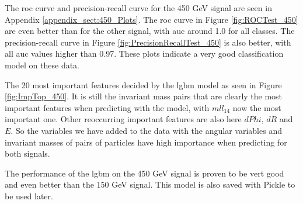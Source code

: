 \documentclass[a4paper, american, 12pt]{report}
\begin{document}
	The \acrshort{roc} curve and precision-recall curve for the 450 GeV signal are seen in Appendix \ref{appendix_sect:450_Plots}. The \acrshort{roc} curve in Figure \ref{fig:ROCTest_450} are even better than for the other signal, with \acrshort{auc} around 1.0 for all classes. The precision-recall curve in Figure \ref{fig:PrecisionRecallTest_450} is also better, with all \acrshort{auc} values higher than 0.97. These plots indicate a very good classification model on these data.
	
	The 20 most important features decided by the \acrshort{lgbm} model as seen in Figure \ref{fig:ImpTop_450}. It is still the invariant mass pairs that are clearly the most important features when predicting with the model, with $mll_14$ now the most important one. Other reoccurring important features are also here $dPhi$, $dR$ and $E$. So the variables we have added to the data with the angular variables and invariant masses of pairs of particles have high importance when predicting for both signals.
	
	The performance of the \acrshort{lgbm} on the 450 GeV signal is proven to be vert good and even better than the 150 GeV signal. This model is also saved with Pickle to be used later.
	
\end{document}
